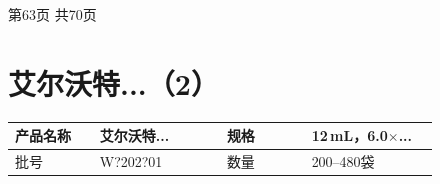 \documentclass[UTF8,10pt,a4paper,fontset=fandol]{ctexart}
\newcommand{\fieldvalue}[1]{#1}
\newcommand{\handwritten}[1]{#1}
\begin{document}
\vfill

\begin{center}
\scriptsize 第63页 共70页
\end{center}

\newpage

\section{艾尔沃特...（2）}

\begin{tabular}{|p{0.18\linewidth}|p{0.27\linewidth}|p{0.18\linewidth}|p{0.27\linewidth}|}
\hline
产品名称 & 艾尔沃特... & 规格 & 12\,mL，6.0$\times$... \\
\hline
批号 &
\fieldvalue{\handwritten{W?202?01}} &
数量 & 200--480袋 \\
\hline
\end{tabular}

\vspace{0.5em}
\end{document}
